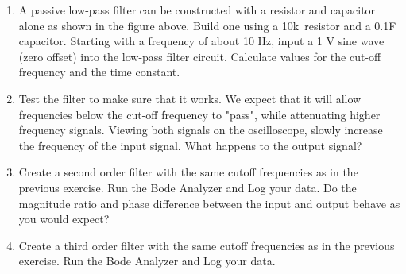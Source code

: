 \documentclass{article}
\begin{document}
\begin{enumerate}
	\item A passive low-pass filter can be constructed with a resistor and capacitor alone as shown in the figure above. Build one using a 10k\textOmega\ resistor and a 0.1\textmu F capacitor. Starting with a frequency of about 10 Hz, input a 1 V sine wave (zero offset) into the low-pass filter circuit. Calculate values for the cut-off frequency and the time constant.
	\item Test the filter to make sure that it works. We expect that it will allow frequencies below the cut-off frequency to "pass", while attenuating higher frequency signals. Viewing both signals on the oscilloscope, slowly increase the frequency of the input signal. What happens to the output signal?
	\item Create a second order filter with the same cutoff frequencies as in the previous exercise. Run the Bode Analyzer and Log your data. Do the magnitude ratio and phase difference between the input and output behave as you would expect?
	\item Create a third order filter with the same cutoff frequencies as in the previous exercise. Run the Bode Analyzer and Log your data.
\end{enumerate}
\end{document}
